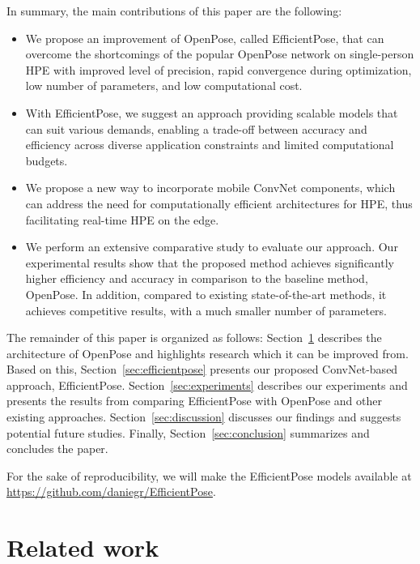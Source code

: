In summary, the main contributions of this paper are the following: 
\begin{itemize}
 \item We propose an improvement of OpenPose, called EfficientPose, that can overcome the shortcomings of the popular OpenPose network on single-person HPE with improved level of precision, rapid convergence during optimization, low number of parameters, and low computational cost.
 \item With EfficientPose, we suggest an approach providing scalable models that can suit various demands, enabling a trade-off between accuracy and efficiency across diverse application constraints and limited computational budgets.
 \item We propose a new way to incorporate mobile ConvNet components, which can address the need for computationally efficient architectures for HPE, thus facilitating real-time HPE on the edge.
 \item We perform an extensive comparative study to evaluate our approach. Our experimental results show that the proposed method achieves significantly higher efficiency and accuracy in comparison to the baseline method, OpenPose. In addition, compared to existing state-of-the-art methods, it achieves competitive results, with a much smaller number of parameters.
\end{itemize}

The remainder of this paper is organized as follows: Section~\ref{sec:related} describes the architecture of OpenPose and highlights research which it can be improved from. Based on this, Section~\ref{sec:efficientpose} presents our proposed ConvNet-based approach, EfficientPose. Section~\ref{sec:experiments} describes our experiments and presents the results from comparing EfficientPose with OpenPose and other existing approaches. Section~\ref{sec:discussion} discusses our findings and suggests potential future studies. Finally, Section~\ref{sec:conclusion} summarizes and concludes the paper.

For the sake of reproducibility, we will make the EfficientPose models available at \url{https://github.com/daniegr/EfficientPose}.

\section{Related work}
\label{sec:related}

